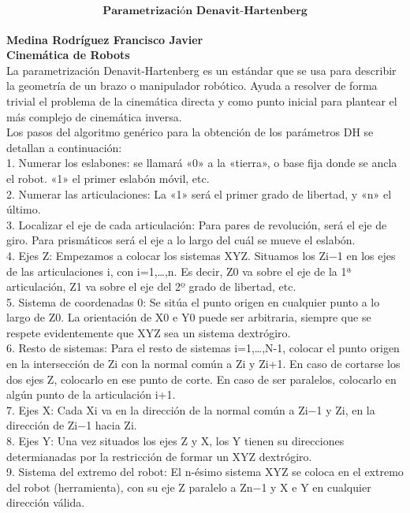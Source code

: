 \documentclass[12pt,a4paper]{report}
\begin{document}
$$\textbf{Parametrización Denavit-Hartenberg}$$\\
\textbf{Medina Rodríguez Francisco Javier\\
Cinemática de Robots}\\

La parametrización Denavit-Hartenberg es un estándar que se usa para describir la geometría de un brazo o manipulador robótico.  Ayuda a resolver de forma trivial el problema de la cinemática directa y como punto inicial para plantear el más complejo de cinemática inversa. \\
Los pasos del algoritmo genérico para la obtención de los parámetros DH se detallan a continuación:\\

1. Numerar los eslabones: se llamará «0» a la «tierra», o base fija donde se ancla el robot. «1» el primer eslabón móvil, etc.\\
2. Numerar las articulaciones: La «1» será el primer grado de libertad, y «n» el último.\\
3. Localizar el eje de cada articulación: Para pares de revolución, será el eje de giro. Para prismáticos será el eje a lo largo del cuál se mueve el eslabón.\\
4. Ejes Z: Empezamos a colocar los sistemas XYZ. Situamos los Zi−1 en los ejes de las articulaciones i, con i=1,…,n. Es decir, Z0 va sobre el eje de la 1ª articulación, Z1 va sobre el eje del 2º grado de libertad, etc.\\
5. Sistema de coordenadas 0: Se sitúa el punto origen en cualquier punto a lo largo de Z0. La orientación de X0 e Y0 puede ser arbitraria, siempre que se respete evidentemente que XYZ sea un sistema dextrógiro.\\
6. Resto de sistemas: Para el resto de sistemas i=1,…,N-1, colocar el punto origen en la intersección de Zi con la normal común a Zi y Zi+1. En caso de cortarse los dos ejes Z, colocarlo en ese punto de corte. En caso de ser paralelos, colocarlo en algún punto de la articulación i+1.\\
7. Ejes X: Cada Xi va en la dirección de la normal común a Zi−1 y Zi, en la dirección de Zi−1 hacia Zi.\\
8. Ejes Y: Una vez situados los ejes Z y X, los Y tienen su direcciones determianadas por la restricción de formar un XYZ dextrógiro.\\
9. Sistema del extremo del robot: El n-ésimo sistema XYZ se coloca en el extremo del robot (herramienta), con su eje Z paralelo a Zn−1 y X e Y en cualquier dirección válida.\\
\end{document}
